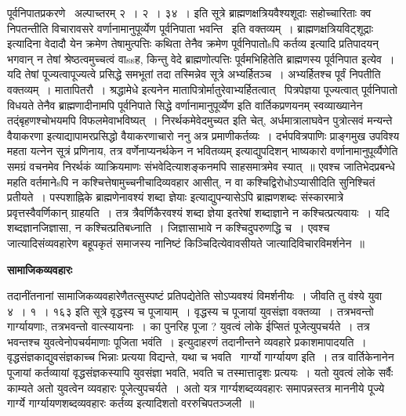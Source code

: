 \documentclass[11pt, openany]{book}
\begin{document}
पूर्वनिपातप्रकरणे \textendash\ अल्पाच्तरम् २~। २~। ३४~। इति सूत्रे ब्राह्मणक्षत्रियवैश्यशूदाः सहोच्चारिताः क्व निपतन्तीति विचारावसरे {\qt वर्णानामानुपूर्व्येण पूर्वनिपाता भवन्ति \textendash\ इति वक्तव्यम्~। ब्राह्मणक्षत्रियविट्शूद्राः} इत्यादिना वेदादौ येन क्रमेण तेषामुत्पत्तिः कथिता तेनैव क्रमेण पूर्वनिपातोsपि कर्तव्य इत्यादि प्रतिपादयन् भगवान् न तेषां श्रेष्ठत्वमुच्चत्वं वाssह, किन्तु वेदे ब्राह्मणोत्पत्तिः पूर्वमभिहितेति ब्राह्मणस्य पूर्वनिपात इत्येव~। यदि तेषां पूज्यत्वापूज्यत्वे प्रसिद्धे समभूतां तदा तस्मिन्नेव सूत्रे {\qt अभ्यर्हितञ्च~।} अभ्यर्हितश्च पूर्वं निपतीति वक्तव्यम्~। मातापितरौ~। श्रद्धामेधे इत्यनेन मातापित्रोर्मातुरेवाभ्यर्हितत्वात् \textendash\ पित्रपेज्ञया पूज्यत्वात् पूर्वनिपातो विधयते तेनैव ब्राह्मणादीनामपि पूर्वनिपाते सिद्धे {\qt वर्णानामानुपूर्व्येण} इति वार्तिकप्रणयनम् स्वव्याख्यानेन तद्ंबृहणश्चोभयमपि विफलमेवाभविष्यत्~। निरर्थकमेवेदमुच्यत इति चेत्, अर्धमात्रालाघवेन पुत्रोत्सवं मन्यन्ते वैयाकरणा इत्याद्यापामरप्रसिद्धो वैयाकरणाचारो ननु अत्र प्रमाणीकर्तव्यः~। {\qt दर्भपवित्रपाणिः प्राङ्गमुख उपविश्य महता यत्नेन सूत्रं प्रणिनाय, तत्र वर्णेनाप्यनर्थकेन न भवितव्यम्} इत्याद्युपदिशन् भाष्यकारो वर्णानामानुपूर्व्यैणेति समग्रं वचनमेव निरर्थकं व्याक्रियमाणः संभवेदित्याशङ्कनमपि साहसमात्रमेव स्यात्~॥ एवश्च जातिभेदप्रबन्धे महति वर्तमानेsपि न कश्चित्तेषामुच्चनीचादिव्यवहार आसीत्, न वा कश्चिद्विरोधोऽप्यासीदिति सुनिश्चितं प्रतीयते~। पस्पशाह्निके ब्राह्मणेनावश्यं शब्दा ज्ञेयाः इत्याद्युपन्यासेऽपि ब्राह्मणशब्दः संस्कारमात्रे प्रवृत्तस्वैवर्णिकान् ग्राहयति~। तत्र त्रैवर्णिकैरवश्यं शब्दा ज्ञेया इतरेषां शब्दाज्ञाने न कश्चित्प्रत्यवायः~। यदि शब्दज्ञानजिज्ञासा, न कश्चित्प्रतिबध्नाति~। जिज्ञासाभावे न कश्चिदुपरुणद्धि च~। एवश्च जात्यादिसंव्यवहारेण बहूपकृतं समाजस्य नानिष्टं किञ्चिदित्येवावसीयते जात्यादिविचारविमर्शनेन~॥

\begin{center}
\textbf{\Large सामाजिकव्यवहारः \textendash\ }
\end{center}

तदानींतनानां सामाजिकव्यवहारेणैतत्सुस्पष्टं प्रतिपद्येतेति सोऽप्यवश्यं विमर्शनीयः~। जीवति तु वंश्ये युवा ४~। १~। १६३ इति सूत्रे {\qt वृद्धस्य च पूजायाम्~। वृद्धस्य च पूजायां युवसंज्ञा वक्तव्या~। तत्रभवन्तो गार्ग्यायणाः, तत्रभवन्तो वात्स्यायनाः~। का पुनरिह पूजा ? युवत्वं लोके ईप्सितं पूजेत्युपचर्यते~। तत्र भवन्तश्च युवत्वेनोपचर्यमाणाः पूजिता भवंति~। } इत्युदाहरणं तदानीन्तने व्यवहारे प्रकाशमापादयति~। वृद्धसंज्ञकाद्युवसंज्ञकाच्च भिन्नाः प्रत्यया विद्यन्ते, यथा च भवति \textendash\ गार्ग्यो गार्ग्यायण इति~। तत्र वार्तिकेनानेन पूजायां कर्तव्यायां वृद्धसंज्ञकस्यापि युवसंज्ञा भवति, भवति च तस्मात्तादृशः प्रत्ययः~। यतो युवत्वं लोके सर्वैः काम्यते अतो युवत्वेन व्यवहारः पूजेत्युपचर्यते~। अतो यत्र गार्ग्यशब्दव्यवहारः समापन्नस्तत्र माननीये पूज्ये गार्ग्ये गार्ग्यायणशब्दव्यवहारः कर्तव्य इत्यादिशतो वररुचिपतञ्जली~॥\\
\end{document}
